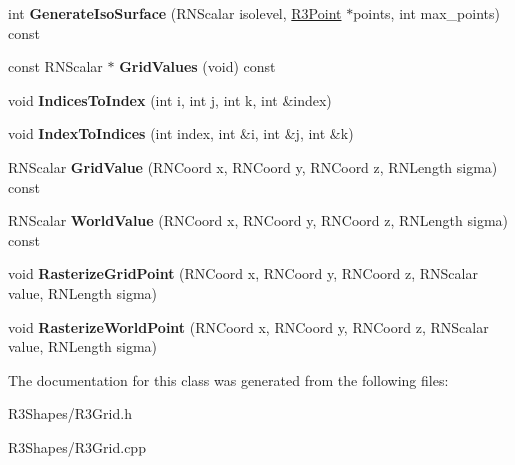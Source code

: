 \begin{DoxyCompactItemize}
\item 
int {\bfseries Generate\+Iso\+Surface} (R\+N\+Scalar isolevel, \hyperlink{class_r3_point}{R3\+Point} $\ast$points, int max\+\_\+points) const \hypertarget{class_r3_grid_aca85821a6d4f7f3365cca626d3dcc610}{}\label{class_r3_grid_aca85821a6d4f7f3365cca626d3dcc610}

\item 
const R\+N\+Scalar $\ast$ {\bfseries Grid\+Values} (void) const \hypertarget{class_r3_grid_a85358f3610996dbb6754c74b31cf3cf0}{}\label{class_r3_grid_a85358f3610996dbb6754c74b31cf3cf0}

\item 
void {\bfseries Indices\+To\+Index} (int i, int j, int k, int \&index)\hypertarget{class_r3_grid_a4076a7ae4619df006aee3ccb4d73d971}{}\label{class_r3_grid_a4076a7ae4619df006aee3ccb4d73d971}

\item 
void {\bfseries Index\+To\+Indices} (int index, int \&i, int \&j, int \&k)\hypertarget{class_r3_grid_a5fbf6a1dc3981b05646f5bf0143d1748}{}\label{class_r3_grid_a5fbf6a1dc3981b05646f5bf0143d1748}

\item 
R\+N\+Scalar {\bfseries Grid\+Value} (R\+N\+Coord x, R\+N\+Coord y, R\+N\+Coord z, R\+N\+Length sigma) const \hypertarget{class_r3_grid_abfd06479ac9fffcd7999a9eb2f4533be}{}\label{class_r3_grid_abfd06479ac9fffcd7999a9eb2f4533be}

\item 
R\+N\+Scalar {\bfseries World\+Value} (R\+N\+Coord x, R\+N\+Coord y, R\+N\+Coord z, R\+N\+Length sigma) const \hypertarget{class_r3_grid_afde1c3c73318d40580fc6c3abc7b5e04}{}\label{class_r3_grid_afde1c3c73318d40580fc6c3abc7b5e04}

\item 
void {\bfseries Rasterize\+Grid\+Point} (R\+N\+Coord x, R\+N\+Coord y, R\+N\+Coord z, R\+N\+Scalar value, R\+N\+Length sigma)\hypertarget{class_r3_grid_a50d8c08548be4e74fbb1bc4e49796d7e}{}\label{class_r3_grid_a50d8c08548be4e74fbb1bc4e49796d7e}

\item 
void {\bfseries Rasterize\+World\+Point} (R\+N\+Coord x, R\+N\+Coord y, R\+N\+Coord z, R\+N\+Scalar value, R\+N\+Length sigma)\hypertarget{class_r3_grid_a5a624e4a8ab046a0c2d5c322a72568df}{}\label{class_r3_grid_a5a624e4a8ab046a0c2d5c322a72568df}

\end{DoxyCompactItemize}


The documentation for this class was generated from the following files\+:\begin{DoxyCompactItemize}
\item 
R3\+Shapes/R3\+Grid.\+h\item 
R3\+Shapes/R3\+Grid.\+cpp\end{DoxyCompactItemize}
